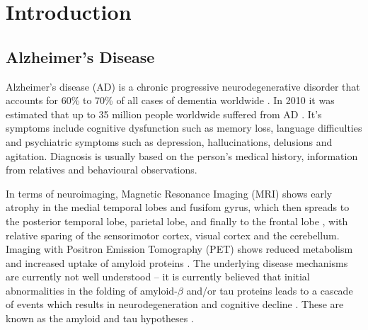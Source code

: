 \chapter{Introduction}
\label{chapter:intro}

\section{Alzheimer's Disease}

Alzheimer's disease (AD) is a chronic progressive neurodegenerative disorder that accounts for 60\% to 70\% of all cases of dementia worldwide \cite{Burns2009,world2013dementia}. In 2010 it was estimated that up to 35 million people worldwide suffered from AD \cite{world2013dementia}. It's symptoms include cognitive dysfunction such as memory loss, language difficulties and psychiatric symptoms such as depression, hallucinations, delusions and agitation. Diagnosis is usually based on the person's medical history, information from relatives and behavioural observations.

In terms of neuroimaging, Magnetic Resonance Imaging (MRI) shows early atrophy in the medial temporal lobes and fusifom gyrus, which then spreads to the posterior temporal lobe, parietal lobe, and finally to the frontal lobe \cite{whitwell2010progression}, with relative sparing of the sensorimotor cortex, visual cortex and the cerebellum. Imaging with Positron Emission Tomography (PET) shows reduced metabolism and increased uptake of amyloid proteins \cite{marcus2014brain}. The underlying disease mechanisms are currently not well understood -- it is currently believed that initial abnormalities in the folding of amyloid-$\beta$ and/or tau proteins leads to a cascade of events which results in neurodegeneration and cognitive decline \cite{mudher2002alzheimer}. These are known as the amyloid and tau hypotheses \cite{mudher2002alzheimer}.


